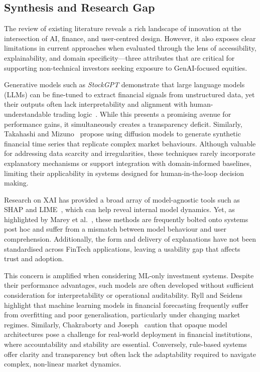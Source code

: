 \subsection{Synthesis and Research Gap}

The review of existing literature reveals a rich landscape of innovation at the intersection of AI, finance, and user-centred design. However, it also exposes clear limitations in current approaches when evaluated through the lens of accessibility, explainability, and domain specificity—three attributes that are critical for supporting non-technical investors seeking exposure to GenAI-focused equities.

Generative models such as \textit{StockGPT} demonstrate that large language models (LLMs) can be fine-tuned to extract financial signals from unstructured data, yet their outputs often lack interpretability and alignment with human-understandable trading logic~\cite{mai2024stockgpt}. While this presents a promising avenue for performance gains, it simultaneously creates a transparency deficit. Similarly, Takahashi and Mizuno~\cite{takahashi2024synthetic} propose using diffusion models to generate synthetic financial time series that replicate complex market behaviours. Although valuable for addressing data scarcity and irregularities, these techniques rarely incorporate explanatory mechanisms or support integration with domain-informed baselines, limiting their applicability in systems designed for human-in-the-loop decision making.

Research on XAI has provided a broad array of model-agnostic tools such as SHAP and LIME~\cite{ribeiro2016lime}, which can help reveal internal model dynamics. Yet, as highlighted by Marey et al.~\cite{marey2024xai}, these methods are frequently bolted onto systems post hoc and suffer from a mismatch between model behaviour and user comprehension. Additionally, the form and delivery of explanations have not been standardised across FinTech applications, leaving a usability gap that affects trust and adoption.

This concern is amplified when considering ML-only investment systems. Despite their performance advantages, such models are often developed without sufficient consideration for interpretability or operational auditability. Ryll and Seidens~\cite{ryll2019mlsurvey} highlight that machine learning models in financial forecasting frequently suffer from overfitting and poor generalisation, particularly under changing market regimes. Similarly, Chakraborty and Joseph~\cite{chakraborty2017boe} caution that opaque model architectures pose a challenge for real-world deployment in financial institutions, where accountability and stability are essential. Conversely, rule-based systems offer clarity and transparency but often lack the adaptability required to navigate complex, non-linear market dynamics.

